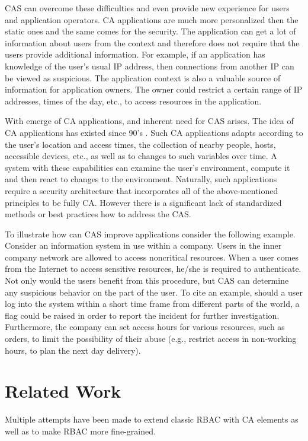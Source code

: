 \documentclass{sig-alternate-05-2015}
\begin{document}
CAS can overcome these difficulties and even provide new experience for users and application operators. CA applications are much more personalized then the static ones and the same comes for the security. The application can get a lot of information about users from the context and therefore does not require that the users provide additional information. For example, if an application has knowledge of the user's usual IP address, then connections from another IP can be viewed as suspicious. The application context is also a valuable source of information for application owners. The owner could restrict a certain range of IP addresses, times of the day, etc., to access resources in the application. 

With emerge of CA applications, and inherent need for CAS arises. The idea of CA applications has existed since 90's \cite{contextaware}. Such CA applications adapts according to the user's location and access times, the collection of nearby people, hosts, accessible devices, etc., as well as to changes to such variables over time. A system with these capabilities can examine the user's environment, compute it and then react to changes to the environment. Naturally, such applications require a security architecture that incorporates all of the above-mentioned principles to be fully CA. However there is a significant lack of standardized methods or best practices how to address the CAS.

To illustrate how can CAS improve applications consider the following example. Consider an information system in use within a company. Users in the inner company network are allowed to access noncritical resources. When a user comes from the Internet to access sensitive resources, he/she is required to authenticate. Not only would the users benefit from this procedure, but CAS can determine any suspicious behavior on the part of the user. To cite an example, should a user log into the system within a short time frame from different parts of the world, a flag could be raised in order to report the incident for further investigation. Furthermore, the company can set access hours for various resources, such as orders, to limit the possibility of their abuse (e.g., restrict access in non-working hours, to plan the next day delivery).

\section{Related Work}
Multiple attempts have been made to extend classic RBAC with CA elements as well as to make RBAC more fine-grained.
\end{document}
